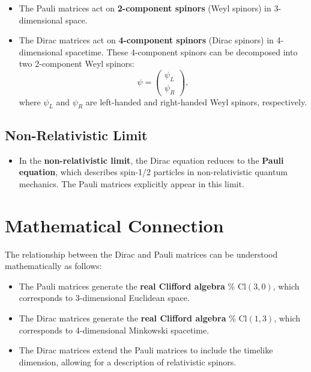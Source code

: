 \documentclass{article}
\begin{document}
\begin{itemize}
\item The Pauli matrices act on \textbf{2-component spinors} (Weyl spinors)
in 3-dimensional space. 

\item The Dirac matrices act on \textbf{4-component spinors} (Dirac spinors)
in 4-dimensional spacetime. These 4-component spinors can be decomposed into
two 2-component Weyl spinors:  
\begin{equation*}
\psi = 
\begin{pmatrix}
\psi_L \\ 
\psi_R%
\end{pmatrix}%
,  
\end{equation*}
where $\psi_L$ and $\psi_R$ are left-handed and right-handed Weyl spinors,
respectively.
\end{itemize}

\subsection*{Non-Relativistic Limit}

\begin{itemize}
\item In the \textbf{non-relativistic limit}, the Dirac equation reduces to
the \textbf{Pauli equation}, which describes spin-1/2 particles in
non-relativistic quantum mechanics. The Pauli matrices explicitly appear in
this limit.
\end{itemize}

\section*{Mathematical Connection}

The relationship between the Dirac and Pauli matrices can be understood
mathematically as follows:

\begin{itemize}
\item The Pauli matrices generate the \textbf{real Clifford algebra} $\text{%
Cl}(3, 0)$, which corresponds to 3-dimensional Euclidean space. 

\item The Dirac matrices generate the \textbf{real Clifford algebra} $\text{%
Cl}(1, 3)$, which corresponds to 4-dimensional Minkowski spacetime. 

\item The Dirac matrices extend the Pauli matrices to include the timelike
dimension, allowing for a description of relativistic spinors.
\end{itemize}
\end{document}

